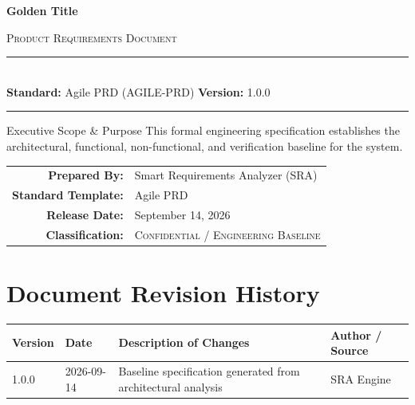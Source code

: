 \documentclass[11pt,a4paper]{article}
\begin{document}
\begin{titlepage}
    \centering
    \vspace*{1.5cm}
    {\Huge\bfseries\sffamily\textcolor{sraprimary}{Golden Title} \par}
    \vspace{0.6cm}
    {\Large\textsc{\textcolor{sraaccent}{Product Requirements Document}} \par}
    \vspace{1.2cm}
    {\color{slateborder}\rule{\linewidth}{1.2pt}}\\[0.4cm]
    {\large \textbf{Standard:} Agile PRD (AGILE-PRD) \quad \textbf{Version:} 1.0.0}\\[0.2cm]
    {\color{slateborder}\rule{\linewidth}{1.2pt}}
    \vspace{1.8cm}

    \begin{infobox}{Executive Scope \& Purpose}
        This formal engineering specification establishes the architectural, functional, non-functional, and verification baseline for the system.
    \end{infobox}

    \vfill
    \begin{tabularx}{0.85\linewidth}{rX}
        \textbf{Prepared By:} & Smart Requirements Analyzer (SRA) \\
        \textbf{Standard Template:} & Agile PRD \\
        \textbf{Release Date:} & September 14, 2026 \\
        \textbf{Classification:} & \textsc{Confidential / Engineering Baseline} \\
    \end{tabularx}
    \vspace{1cm}
\end{titlepage}

\tableofcontents
\newpage

\section*{Document Revision History}
\begin{table}[h!]
\centering
\begin{tabularx}{\linewidth}{l l X l}
\toprule
\textbf{Version} & \textbf{Date} & \textbf{Description of Changes} & \textbf{Author / Source} \\
\midrule
1.0.0 & 2026-09-14 & Baseline specification generated from architectural analysis & SRA Engine \\
\bottomrule
\end{tabularx}
\end{table}
\vspace{1cm}
\end{document}

